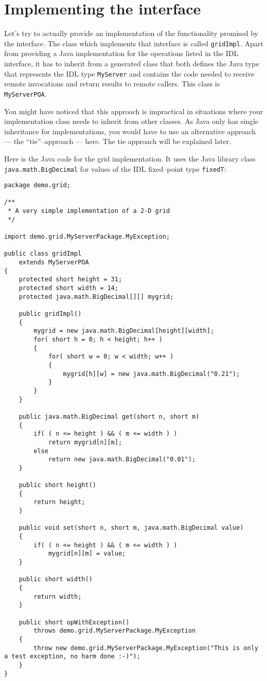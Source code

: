 \section{Implementing the interface}

Let's try to actually provide an implementation of the functionality
promised by the interface. The class which implements that interface
is called {\tt gridImpl}.  Apart from providing a Java implementation
for the operations listed in the IDL interface, it has to inherit from
a generated class that both defines the Java type that represents the
IDL type {\tt MyServer} and contains the code needed to receive remote
invocations and return results to remote callers.  This class is {\tt
  MyServerPOA}.

You might have noticed that this approach is impractical in situations
where your  implementation class needs to inherit  from other classes.
As  Java only has  single inheritance  for implementations,  you would
have  to use  an alternative  approach ---  the  ``tie''--approach ---
here. The tie approach will be explained later.

Here is  the Java code for  the grid implementation. It  uses the Java
library  class  {\tt  java.math.BigDecimal}  for  values  of  the  IDL
fixed--point type {\tt fixedT}:

\small{
\begin{verbatim}
package demo.grid;

/**
 * A very simple implementation of a 2-D grid
 */

import demo.grid.MyServerPackage.MyException;

public class gridImpl
    extends MyServerPOA
{
    protected short height = 31;
    protected short width = 14;
    protected java.math.BigDecimal[][] mygrid;

    public gridImpl()
    {
        mygrid = new java.math.BigDecimal[height][width];
        for( short h = 0; h < height; h++ )
        {
            for( short w = 0; w < width; w++ )
            {
                mygrid[h][w] = new java.math.BigDecimal("0.21");
            }
        }
    }

    public java.math.BigDecimal get(short n, short m)
    {
        if( ( n <= height ) && ( m <= width ) )
            return mygrid[n][m];
        else
            return new java.math.BigDecimal("0.01");
    }

    public short height()
    {
        return height;
    }

    public void set(short n, short m, java.math.BigDecimal value)
    {
        if( ( n <= height ) && ( m <= width ) )
            mygrid[n][m] = value;
    }

    public short width()
    {
        return width;
    }

    public short opWithException()
        throws demo.grid.MyServerPackage.MyException
    {
        throw new demo.grid.MyServerPackage.MyException("This is only a test exception, no harm done :-)");
    }
}
\end{verbatim}
}

